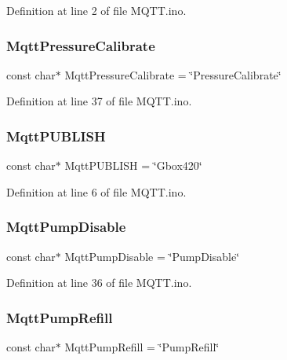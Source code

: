 Definition at line 2 of file M\+Q\+T\+T.\+ino.

\mbox{\label{_m_q_t_t_8ino_aa71fb2965e72473393945684b3e97fee}} 
\subsubsection{\texorpdfstring{MqttPressureCalibrate}{MqttPressureCalibrate}}
{\footnotesize\ttfamily const char$\ast$ Mqtt\+Pressure\+Calibrate = \char`\"{}Pressure\+Calibrate\char`\"{}}



Definition at line 37 of file M\+Q\+T\+T.\+ino.

\mbox{\label{_m_q_t_t_8ino_a344cb894a938ef9812583b932b27e291}} 
\subsubsection{\texorpdfstring{MqttPUBLISH}{MqttPUBLISH}}
{\footnotesize\ttfamily const char$\ast$ Mqtt\+P\+U\+B\+L\+I\+SH = \char`\"{}Gbox420\char`\"{}}



Definition at line 6 of file M\+Q\+T\+T.\+ino.

\mbox{\label{_m_q_t_t_8ino_a6bb873a0115e9d7a67eef723d5e5f48d}} 
\subsubsection{\texorpdfstring{MqttPumpDisable}{MqttPumpDisable}}
{\footnotesize\ttfamily const char$\ast$ Mqtt\+Pump\+Disable = \char`\"{}Pump\+Disable\char`\"{}}



Definition at line 36 of file M\+Q\+T\+T.\+ino.

\mbox{\label{_m_q_t_t_8ino_a0d26f68d4ae315e6af62e256d9dcab63}} 
\subsubsection{\texorpdfstring{MqttPumpRefill}{MqttPumpRefill}}
{\footnotesize\ttfamily const char$\ast$ Mqtt\+Pump\+Refill = \char`\"{}Pump\+Refill\char`\"{}}



